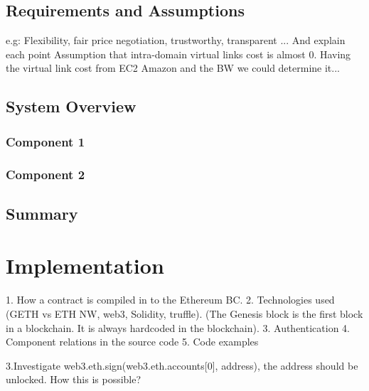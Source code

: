 \section{Requirements and Assumptions}

e.g: Flexibility, fair price negotiation, trustworthy, transparent ... And explain each point
Assumption that intra-domain virtual links cost is almost 0. Having the virtual link cost from EC2 Amazon and the BW we could determine it...

\section{System Overview}

\subsection{Component 1}

\subsection{Component 2}

\section{Summary}

\chapter{Implementation}

1. How a contract is compiled in to the Ethereum BC.
2. Technologies used (GETH vs ETH NW, web3, Solidity, truffle).
(The Genesis block is the first block in a blockchain. It is always hardcoded in the blockchain).
3. Authentication 
4. Component relations in the source code
5. Code examples

3.Investigate web3.eth.sign(web3.eth.accounts[0], address), the address should be unlocked. How this is possible?

\label{ch:implementation}



